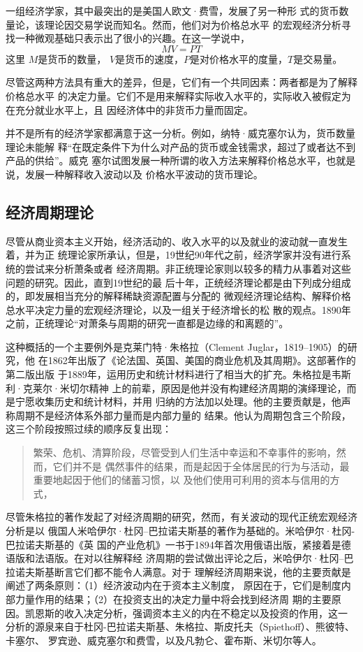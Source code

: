 一组经济学家，其中最突出的是美国人欧文·费雪，发展了另一种形
式的货币数量论，该理论因交易学说而知名。然而，他们对为价格总水平
的宏观经济分析寻找一种微观基础只表示出了很小的兴趣。在这一学说中，
\[ MV = PT \]
这里 $M$是货币的数量， $V$是货币的速度，$P$是对价格水平的度量，$T$是交易量。

尽管这两种方法具有重大的差异，但是，它们有一个共同因素：两者都是为了解释价格总水平
的决定力量。它们不是用来解释实际收入水平的，实际收入被假定为在充分就业水平上，且
因经济体中的非货币力量而固定。

并不是所有的经济学家都满意于这一分析。例如，纳特·威克塞尔认为，货币数量理论未能解
释“在既定条件下为什么对产品的货币或金钱需求，超过了或者达不到产品的供给”。威克
塞尔试图发展一种所谓的收入方法来解释价格总水平，也就是说，发展一种解释收入波动以及
价格水平波动的货币理论。

\subsection{经济周期理论}

尽管从商业资本主义开始，经济活动的、收入水平的以及就业的波动就一直发生着，并为正
统理论家所承认，但是，19世纪90年代之前，经济学家并没有进行系统的尝试来分析萧条或者
经济周期。非正统理论家则以较多的精力从事着对这些问题的研究。因此，直到19世纪的最
后十年，正统经济理论都是由下列成分组成的，即发展相当充分的解释稀缺资源配置与分配的
微观经济理论结构、解释价格总水平决定力量的宏观经济理论，以及一组关于经济增长的松
散的观点。1890年之前，正统理论“对萧条与周期的研究一直都是边缘的和离题的”。

这种概括的一个主要例外是克莱门特·朱格拉（Clement Juglar，1819--1905）的研究，他
在1862年出版了《论法国、英国、美国的商业危机及其周期》。这部著作的第二版出版
于1889年，运用历史和统计材料进行了相当大的扩充。朱格拉是韦斯利·克莱尔·米切尔精神
上的前辈，原因是他并没有构建经济周期的演绎理论，而是宁愿收集历史和统计材料，并用
归纳的方法加以处理。他的主要贡献是，他声称周期不是经济体系外部力量而是内部力量的
结果。他认为周期包含三个阶段，这三个阶段按照过续的顺序反复出现：

\begin{quotation}
  繁荣、危机、清算阶段，尽管受到人们生活中幸运和不幸事件的影响，然而，它们并不是
  偶然事件的结果，而是起因于全体居民的行为与活动，最重要地起因于他们的储蓄习惯，以
  及他们使用可利用的资本与信用的方式，
\end{quotation}

尽管朱格拉的著作发起了对经济周期的研究，然而，有关波动的现代正统宏观经济分析是以
俄国人米哈伊尔·杜冈--巴拉诺夫斯基的著作为基础的。米哈伊尔·杜冈-巴拉诺夫斯基的《英
国的产业危机》一书于1894年首次用俄语出版，紧接着是德语版和法语版。在对以往解释经
济周期的尝试做出评论之后，米哈伊尔·杜冈--巴拉诺夫斯基断言它们都不能令人满意。对于
理解经济周期来说，他的主要贡献是阐述了两条原则：（1）经济波动内在于资本主义制度，
原因在于，它们是制度内部力量作用的结果；（2）在投资支出的决定力量中将会找到经济周
期的主要原因。凯恩斯的收入决定分析，强调资本主义的内在不稳定以及投资的作用，这一
分析的源泉来自于杜冈-巴拉诺夫斯基、朱格拉、斯皮托夫（Spiethoff）、熊彼特、卡塞尔、
罗宾逊、威克塞尔和费雪，以及凡勃仑、霍布斯、米切尔等人。

